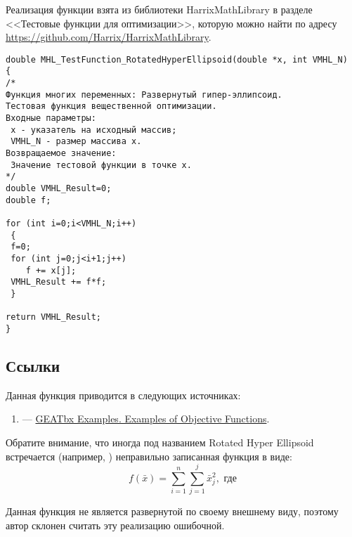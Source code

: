 Реализация функции взята из библиотеки HarrixMathLibrary в разделе <<Тестовые функции для оптимизации>>, которую можно найти по адресу \href{https://github.com/Harrix/HarrixMathLibrary} {https://github.com/Harrix/HarrixMathLibrary}.

\begin{lstlisting}[caption=Код функции MHL\_TestFunction\_RotatedHyperEllipsoid]
double MHL_TestFunction_RotatedHyperEllipsoid(double *x, int VMHL_N)
{
/*
Функция многих переменных: Развернутый гипер-эллипсоид.
Тестовая функция вещественной оптимизации.
Входные параметры:
 x - указатель на исходный массив;
 VMHL_N - размер массива x.
Возвращаемое значение:
 Значение тестовой функции в точке x.
*/
double VMHL_Result=0;
double f;

for (int i=0;i<VMHL_N;i++)
 {
 f=0;
 for (int j=0;j<i+1;j++)
    f += x[j];
 VMHL_Result += f*f;
 }

return VMHL_Result;
}
\end{lstlisting}

\subsection {Ссылки}

Данная функция приводится в следующих источниках:

\begin{enumerate}
\item \cite[стр. 4]{web:GEATbxExamples} ---  \href{http://www.geatbx.com/download/GEATbx_ObjFunExpl_v38.pdf}{GEATbx Examples. Examples of Objective Functions}.
\end{enumerate}

Обратите внимание, что иногда под названием Rotated Hyper Ellipsoid встречается (например, \cite{web:www.sfu.ca:rotated_hyper-ellipsoid}) неправильно записанная функция в виде:
\begin{equation*}
\label{TestFunctions:eq:MHL_RotatedHyperEllipsoidError}
f\left( \bar{x}\right) = \sum_{i=1}^{n} \sum_{j=1}^{j}\bar{x}_j^2, \text{ где}
\end{equation*}

Данная функция не является развернутой по своему внешнему виду, поэтому автор склонен считать эту реализацию ошибочной.
